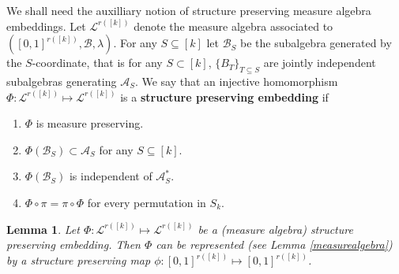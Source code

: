 \documentclass [11pt] {article}
\newtheorem{lemma}{Lemma}[section]
\begin{document}
\bigskip
\noindent
We shall need the auxilliary notion of
structure preserving measure algebra embeddings.
Let $\mathcal{L}^{r([k])}$ denote the measure algebra
associated to $([0,1]^{r([k])}, \mathcal{B},\lambda)$.
For any $S\subseteq [k]$ let $\mathcal{B}_S$ be the subalgebra
generated by the $S$-coordinate, that is for any $S\subset [k]$,
$\{B_T\}_{T\subseteq S}$ are jointly independent subalgebras
generating $\mathcal{A}_S$.
We say that an injective homomorphism
 $\Phi:\mathcal{L}^{r([k])}\mapsto \mathcal{L}^{r([k])}$ is 
a {\bf structure preserving embedding} if

\begin{enumerate}
\item $\Phi$ is measure preserving.
\item $\Phi(\mathcal{B}_S)\subset \mathcal{A}_S$ for any $S\subseteq [k]$.
\item $\Phi(\mathcal{B}_S)$ is independent of $\mathcal{A}^*_S$.
\item $\Phi\circ\pi=\pi\circ\Phi$ for every permutation in $S_k$.
\end{enumerate}
\begin{lemma} Let $\Phi:\mathcal{L}^{r([k])}\mapsto\mathcal{L}^{r([k])}$ be a
  (measure algebra) structure preserving embedding. Then $\Phi$ can be 
represented (see Lemma \ref{measurealgebra}) by a structure preserving map 
$\phi:[0,1]^{r([k])}\mapsto[0,1]^{r([k])}$. \label{lem42}
\end{lemma}
\end{document}
